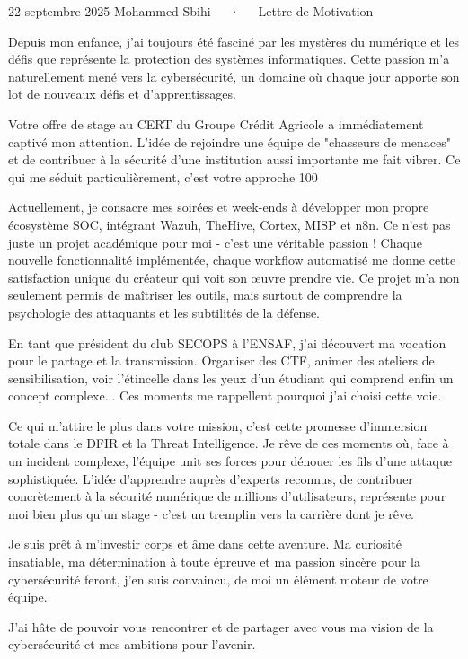 \documentclass[11pt, a4paper]{awesome-cv}
\begin{document}
\makecvheader[R]

\makecvfooter
{22 septembre 2025}
{Mohammed Sbihi~~~·~~~Lettre de Motivation}
{}

\makelettertitle

\begin{cvletter}

    Depuis mon enfance, j'ai toujours été fasciné par les mystères du numérique et les défis que représente la protection des systèmes informatiques. Cette passion m'a naturellement mené vers la cybersécurité, un domaine où chaque jour apporte son lot de nouveaux défis et d'apprentissages.

    Votre offre de stage au CERT du Groupe Crédit Agricole a immédiatement captivé mon attention. L'idée de rejoindre une équipe de "chasseurs de menaces" et de contribuer à la sécurité d'une institution aussi importante me fait vibrer. Ce qui me séduit particulièrement, c'est votre approche 100%

    Actuellement, je consacre mes soirées et week-ends à développer mon propre écosystème SOC, intégrant Wazuh, TheHive, Cortex, MISP et n8n. Ce n'est pas juste un projet académique pour moi - c'est une véritable passion ! Chaque nouvelle fonctionnalité implémentée, chaque workflow automatisé me donne cette satisfaction unique du créateur qui voit son œuvre prendre vie. Ce projet m'a non seulement permis de maîtriser les outils, mais surtout de comprendre la psychologie des attaquants et les subtilités de la défense.

    En tant que président du club SECOPS à l'ENSAF, j'ai découvert ma vocation pour le partage et la transmission. Organiser des CTF, animer des ateliers de sensibilisation, voir l'étincelle dans les yeux d'un étudiant qui comprend enfin un concept complexe... Ces moments me rappellent pourquoi j'ai choisi cette voie.

    Ce qui m'attire le plus dans votre mission, c'est cette promesse d'immersion totale dans le DFIR et la Threat Intelligence. Je rêve de ces moments où, face à un incident complexe, l'équipe unit ses forces pour dénouer les fils d'une attaque sophistiquée. L'idée d'apprendre auprès d'experts reconnus, de contribuer concrètement à la sécurité numérique de millions d'utilisateurs, représente pour moi bien plus qu'un stage - c'est un tremplin vers la carrière dont je rêve.

    Je suis prêt à m'investir corps et âme dans cette aventure. Ma curiosité insatiable, ma détermination à toute épreuve et ma passion sincère pour la cybersécurité feront, j'en suis convaincu, de moi un élément moteur de votre équipe.

    J'ai hâte de pouvoir vous rencontrer et de partager avec vous ma vision de la cybersécurité et mes ambitions pour l'avenir.

\end{cvletter}

\makeletterclosing
\end{document}
